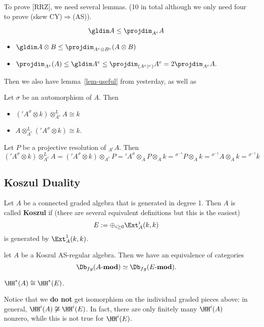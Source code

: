 \documentclass[12pt]{article}
\newcommand*{\Amod}{A\text{-}\mathbf{mod}}
\begin{document}
To prove [RRZ], we need several lemmas. (10 in total although we only need four to prove (skew CY)$\Rightarrow$(AS)).
\begin{lem}
	\[\gldim A\le \projdim_{A^e}A\]
\end{lem}
\begin{lem}
	\begin{itemize}
		\item $\gldim A\otimes B\le \projdim_{A^e\otimes B^e}(A\otimes B)$
		\item $\projdim_{A^e}(A)\le \gldim A^e\le \projdim_{(A^e)^e)}A^e=2\projdim_{A^e}A.$
	\end{itemize}
\end{lem}
Then we also have lemma~\ref{lem-useful} from yesterday, as well as 
\begin{lem}
	Let $\sigma$ be an automorphism of $A$. Then 
	\begin{itemize}
		\item $('A^\sigma\otimes k)\otimes_{A^e}^LA\cong k$
		\item $A\otimes_{A^e}^L('A^\sigma\otimes k)\cong k$.
	\end{itemize}
\end{lem}
\begin{prf}
	Let $P$ be a projective resolution of ${_{A^e}}A$. Then 
	\[('A^\sigma\otimes k)\otimes_{A^e}^LA=('A^\sigma\otimes k)\otimes_{A^e}P='A^\sigma\otimes_AP\otimes_Ak={^{\sigma^{-1}}}P\otimes_A k={^{\sigma^{-1}}}A\otimes_Ak={^{\sigma^{-1}}}k\]
\end{prf}

\subsection{Koszul Duality}
\begin{defn}
	Let $A$ be a connected graded algebra that is generated in degree 1. Then $A$ is called \textbf{Koszul} if 
	(there are several equivalent definitions but this is the easiest) 
	\[E:=\oplus_{i\ge 0}\Ext_A^i(k,k)\] 
	is generated by $\Ext_A^1(k,k)$.
\end{defn}
\begin{thm}
	let $A$ be a Koszul AS-regular algebra. Then we have an equivalence of categories
	\[\Db_{fg}(\Amod)\simeq \Db_{fg}(E\text{-}\mathbf{mod}).\]
\end{thm}
\begin{cor}
	$\HH^\ast(A)\cong\HH^\ast(E)$.
\end{cor}
\begin{rmk}
	Notice that we \textbf{do not} get isomorphism on the individual graded pieces above: in general, $\HH^i(A)\not\cong\HH^i(E)$.
	In fact, there are only finitely many $\HH^i(A)$ nonzero, while this is not true for $\HH^i(E)$.
\end{rmk}
\end{document}
